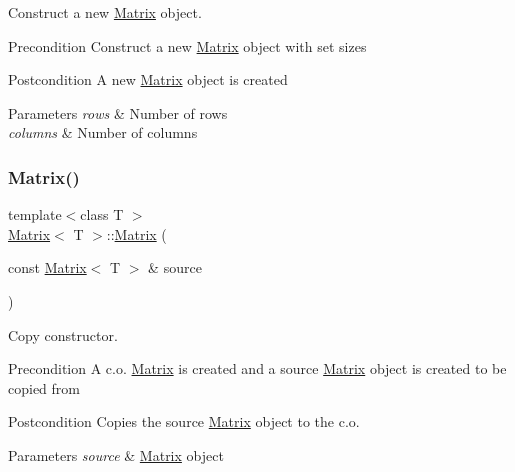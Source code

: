 Construct a new \mbox{\hyperlink{class_matrix}{Matrix}} object. 

\begin{DoxyPrecond}{Precondition}
Construct a new \mbox{\hyperlink{class_matrix}{Matrix}} object with set sizes 
\end{DoxyPrecond}
\begin{DoxyPostcond}{Postcondition}
A new \mbox{\hyperlink{class_matrix}{Matrix}} object is created 
\end{DoxyPostcond}

\begin{DoxyParams}{Parameters}
{\em rows} & Number of rows \\
\hline
{\em columns} & Number of columns \\
\hline
\end{DoxyParams}
\mbox{\label{class_matrix_abc1e84ee28720ecc8a6807bb3f09f43e}} 
\subsubsection{\texorpdfstring{Matrix()}{Matrix()}\hspace{0.1cm}{\footnotesize\ttfamily [3/4]}}
{\footnotesize\ttfamily template$<$class T $>$ \\
\mbox{\hyperlink{class_matrix}{Matrix}}$<$ T $>$\+::\mbox{\hyperlink{class_matrix}{Matrix}} (\begin{DoxyParamCaption}\item[{const \mbox{\hyperlink{class_matrix}{Matrix}}$<$ T $>$ \&}]{source }\end{DoxyParamCaption})}



Copy constructor. 

\begin{DoxyPrecond}{Precondition}
A c.\+o. \mbox{\hyperlink{class_matrix}{Matrix}} is created and a source \mbox{\hyperlink{class_matrix}{Matrix}} object is created to be copied from 
\end{DoxyPrecond}
\begin{DoxyPostcond}{Postcondition}
Copies the source \mbox{\hyperlink{class_matrix}{Matrix}} object to the c.\+o. 
\end{DoxyPostcond}

\begin{DoxyParams}{Parameters}
{\em source} & \mbox{\hyperlink{class_matrix}{Matrix}} object \\
\hline
\end{DoxyParams}
\mbox{\label{class_matrix_a91aa704de674203e96aece9e1955ccd3}} 

